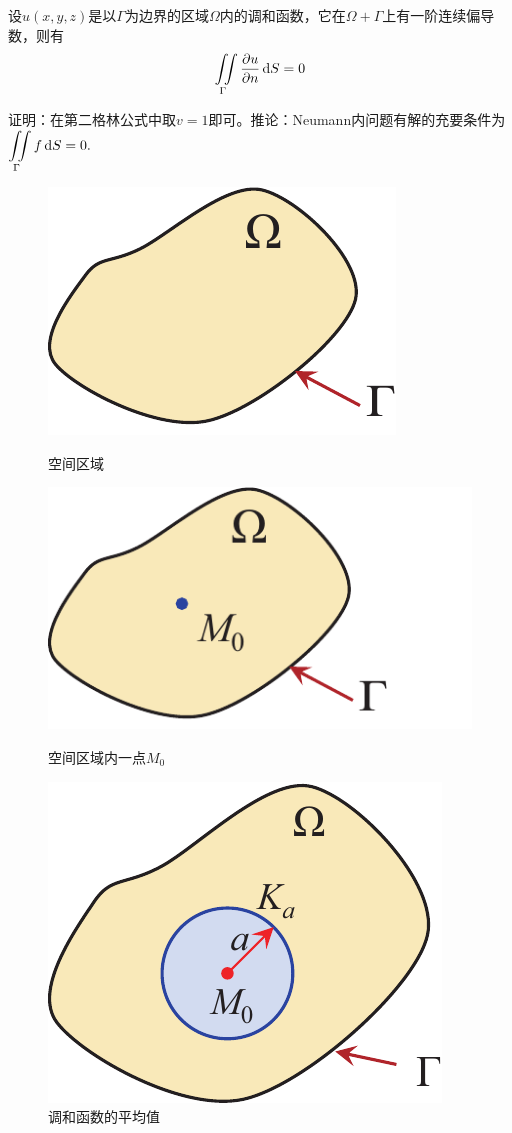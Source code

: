 设$u(x,y,z)$是以$\Gamma$为边界的区域$\Omega$内的调和函数，它在$\Omega + \Gamma$上有一阶连续偏导数，则有
\begin{equation}
	\iint\limits_{\Gamma} \dfrac{\partial u}{\partial n}\, {\rm{d}} S =0
\end{equation}

证明：在第二格林公式中取$v=1$即可。推论：Neumann内问题有解的充要条件为$\displaystyle \iint\limits_{\Gamma} f\, {\rm{d}} S = 0.$

\begin{figure}[!htb]
	\begin{minipage}{0.33\linewidth}
		\centering
		\includegraphics[width=0.6\linewidth]{pic/格林无点.pdf}
		\caption{空间区域}
		\label{格林3}
	\end{minipage}
	\begin{minipage}{0.33\linewidth}
		\centering
		\includegraphics[width=0.6\linewidth]{pic/格林.pdf}
		\caption{空间区域内一点$M_0$}
		\label{格林4}
	\end{minipage}
	\begin{minipage}{0.33\linewidth}
	\centering
	\includegraphics[width=0.5\linewidth]{pic/格林平均.pdf}
	\caption{调和函数的平均值}
	\label{格林5}
	\end{minipage}
\end{figure}


